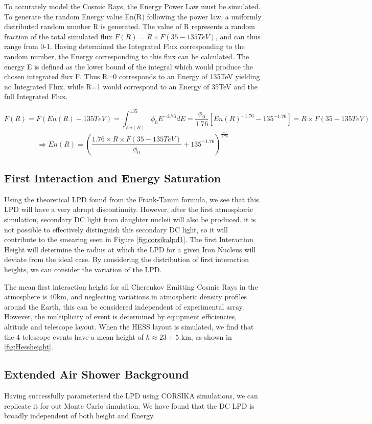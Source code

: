 \documentclass{article}
\begin{document}
To accurately model the Cosmic Rays, the Energy Power Law must be simulated. To generate the random Energy value En(R) following the power law, a uniformly distributed random number R is generated. The value of R represents a random fraction of the total simulated flux $ F(R) = R \times F(35-135TeV) $, and can thus range from 0-1. Having determined the Integrated Flux corresponding to the random number, the Energy corresponding to this flux can be calculated. The energy E is defined as the lower bound of the integral which would produce the chosen integrated flux F. Thus R=0 corresponds to an Energy of 135TeV yielding no Integrated Flux, while R=1 would correspond to an Energy of 35TeV and the full Integrated Flux.

\[ F(R) = F(En(R)-135TeV) = \int_{En(R)}^{135} \phi_{0} E^{-2.76} dE =\frac{\phi_{0}}{1.76}[En(R)^{-1.76} - 135^{-1.76}]= R \times F(35-135TeV)\] \[\Longrightarrow  En(R) = (\frac{1.76\times R \times F(35-135TeV)}{\phi_{0}} +135^{-1.76})^{\frac{-1}{1.76}} \]

\subsection{First Interaction and Energy Saturation}
Using the theoretical LPD found from the Frank-Tamm formula, we see that this LPD will have a very abrupt discontinuity. However, after the first atmospheric simulation, secondary DC light from daughter nucleii will also be produced. it is not possible to effectively distinguish this secondary DC light, so it will contribute to the smearing seen in Figure \ref{fig:corsikalpd1}. The first Interaction Height will determine the radius at which the LPD for a given Iron Nucleus will deviate from the ideal case. By considering the distribution of first interaction heights, we can consider the variation of the LPD. 

The mean first interaction height for all Cherenkov Emitting Cosmic Rays in the atmosphere is 40km, and neglecting variations in atmospheric density profiles around the Earth, this can be considered independent of experimental array. However, the multiplicity of event is determined by equipment efficiencies, altitude and telescope layout. When the HESS layout is simulated, we find that the 4 telescope events have a mean height of $h \approx 23 \pm 5$ km, as shown in \ref{fig:Hessheight}.

\subsection{Extended Air Shower Background}
Having successfully parameterised the LPD using CORSIKA simulations, we can replicate it for out Monte Carlo simulation. We have found that the DC LPD is broadly independent of both height and Energy. 
\end{document}
